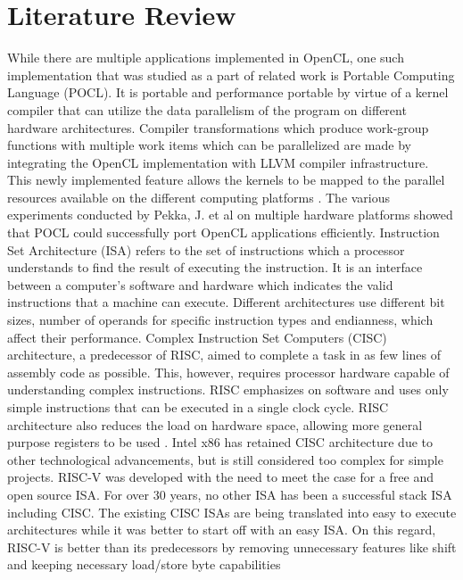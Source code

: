 \chapter{Literature Review}
\label{ch3_lit_review}
While there are multiple applications implemented in OpenCL, one such implementation that was studied as a part of related work is Portable Computing Language (POCL). It is portable and performance portable by virtue of a kernel compiler that can utilize the data parallelism of the program on different hardware architectures. Compiler transformations which produce work-group functions with multiple work items which can be parallelized are made by integrating the OpenCL implementation with LLVM compiler infrastructure. This newly implemented feature allows the kernels to be mapped to the parallel resources available on the different computing platforms
\cite{pocl}. The various experiments conducted by Pekka, J. et al on multiple hardware platforms showed that POCL could successfully port OpenCL applications efficiently.\newline\newline
Instruction Set Architecture (ISA) refers to the set of instructions which a processor understands to find the result of executing the instruction. It is an interface between a computer’s software and hardware which indicates the valid instructions that a machine can execute. Different architectures use different bit sizes, number of operands for specific instruction types and endianness, which affect their performance.\newline\newline
Complex Instruction Set Computers (CISC) architecture, a predecessor of RISC, aimed to complete a task in as few lines of assembly code as possible. This, however, requires processor hardware capable of understanding complex instructions. RISC emphasizes on software and uses only simple instructions that can be executed in a single clock cycle. RISC architecture also reduces the load on hardware space, allowing more general purpose registers to be used
\cite{risc_vs_cisc}. Intel x86 has retained CISC architecture due to other technological advancements, but is still considered too complex for simple projects.\newline \newline
RISC-V was developed with the need to meet the case for a free and open source ISA. For over 30 years, no other ISA has been a successful stack ISA including CISC. The existing CISC ISAs are being translated into easy to execute architectures while it was better to start off with an easy ISA. On this regard, RISC-V is better than its predecessors by removing unnecessary features like shift and keeping necessary load/store byte capabilities
